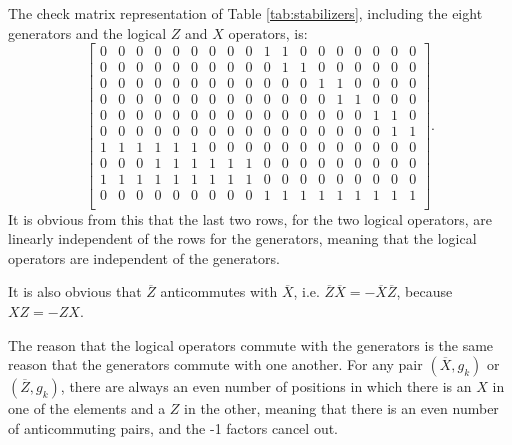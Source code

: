 \documentclass[12pt]{extarticle}
\begin{document}
The check matrix representation of Table \ref{tab:stabilizers}, including the eight generators and the logical $Z$ and $X$ operators, is:
\[
\left[
\begin{array}{ccccccccc|ccccccccc}
    0 & 0 & 0 & 0 & 0 & 0 & 0 & 0 & 0  &  1 & 1 & 0 & 0 & 0 & 0 & 0 & 0 & 0 \\
    0 & 0 & 0 & 0 & 0 & 0 & 0 & 0 & 0  &  0 & 1 & 1 & 0 & 0 & 0 & 0 & 0 & 0 \\
    0 & 0 & 0 & 0 & 0 & 0 & 0 & 0 & 0  &  0 & 0 & 0 & 1 & 1 & 0 & 0 & 0 & 0 \\
    0 & 0 & 0 & 0 & 0 & 0 & 0 & 0 & 0  &  0 & 0 & 0 & 0 & 1 & 1 & 0 & 0 & 0 \\
    0 & 0 & 0 & 0 & 0 & 0 & 0 & 0 & 0  &  0 & 0 & 0 & 0 & 0 & 0 & 1 & 1 & 0 \\
    0 & 0 & 0 & 0 & 0 & 0 & 0 & 0 & 0  &  0 & 0 & 0 & 0 & 0 & 0 & 0 & 1 & 1 \\
    1 & 1 & 1 & 1 & 1 & 1 & 0 & 0 & 0  &  0 & 0 & 0 & 0 & 0 & 0 & 0 & 0 & 0 \\
    0 & 0 & 0 & 1 & 1 & 1 & 1 & 1 & 1  &  0 & 0 & 0 & 0 & 0 & 0 & 0 & 0 & 0 \\
    1 & 1 & 1 & 1 & 1 & 1 & 1 & 1 & 1  &  0 & 0 & 0 & 0 & 0 & 0 & 0 & 0 & 0 \\
    0 & 0 & 0 & 0 & 0 & 0 & 0 & 0 & 0  &  1 & 1 & 1 & 1 & 1 & 1 & 1 & 1 & 1 \\
\end{array}
\right].
\]
It is obvious from this that the last two rows, for the two logical operators, are linearly independent of the rows for the generators,
meaning that the logical operators are independent of the generators.

It is also obvious that $\overline{Z}$ anticommutes with $\overline{X}$, i.e. $\overline{Z}\overline{X} = -\overline{X}\overline{Z}$,
because $XZ = -ZX$.

The reason that the logical operators commute with the generators is the same reason that the generators commute with one another.
For any pair $(\overline{X},g_k)$ or $(\overline{Z},g_k)$, there are always an even number of positions in which there is an $X$ in one of the elements and a $Z$ in the other,
meaning that there is an even number of anticommuting pairs, and the -1 factors cancel out.

\end{document}
